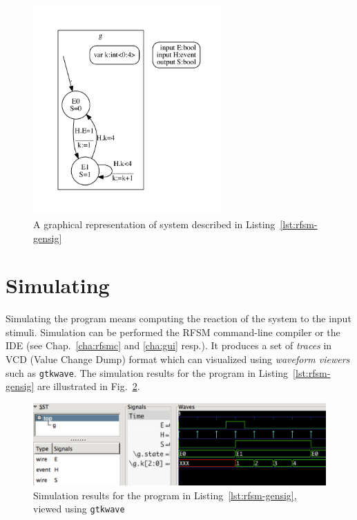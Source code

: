 \begin{figure}[!h]
   \includegraphics[height=8cm]{figs/gensig-top}
   \centering
  \caption{A graphical representation of system described in Listing~\ref{lst:rfsm-gensig}}
  \label{fig:rfsm-gensig-top}
\end{figure}

\section*{Simulating}
\label{sec:simulating-1}

Simulating the program means computing the reaction of the system to the input stimuli. Simulation
can be performed the RFSM command-line compiler or the IDE (see Chap.~\ref{cha:rfsmc} and \ref{cha:gui} resp.).
It produces a set of
\emph{traces} in VCD (Value Change Dump) format which can visualized using \emph{waveform viewers}
such as \texttt{gtkwave}. The simulation results for the program in Listing~\ref{lst:rfsm-gensig}
are illustrated in Fig.~\ref{fig:rfsm-gensig-chrono}.

\begin{figure}[!h]
   \includegraphics[width=\textwidth]{figs/gensig-chrono}
   \centering
  \caption{Simulation results for the program in Listing~\ref{lst:rfsm-gensig}, viewed using
    \texttt{gtkwave}}
  \label{fig:rfsm-gensig-chrono}
\end{figure}

